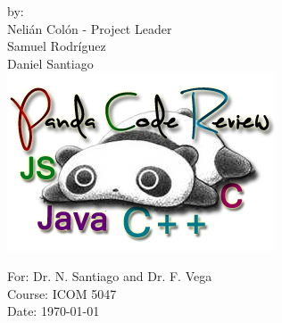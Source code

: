 \begin{titlepage}
\begin{center}
by: \\[0.3cm]

Neli\'{a}n Col\'{o}n - Project Leader \\
Samuel Rodr\'{i}guez \\
Daniel Santiago \\[1cm]

\includegraphics[scale=1.25]{img/pandaLogo}\\[1cm]

\vfill

For: Dr. N. Santiago and Dr. F. Vega \\
Course: ICOM 5047 \\
Date: \today






\end{center}

\end{titlepage}
